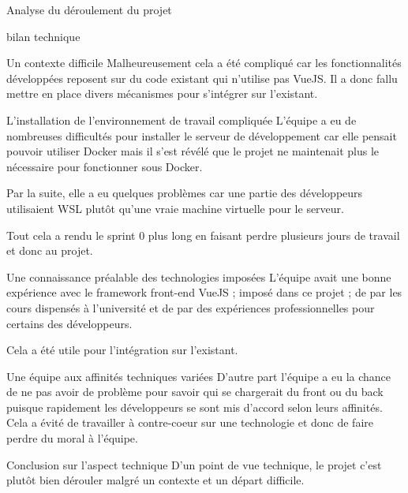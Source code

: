\documentclass[]{article}
\begin{document}
{\begin{section}{Analyse du déroulement du projet}
\begin{subsection}{bilan technique}
\begin{subsubsection}{Un contexte difficile}
         Malheureusement cela a été compliqué car les fonctionnalités développées reposent sur du code existant qui n'utilise pas VueJS. Il a donc fallu mettre en place divers mécanismes pour s'intégrer sur l'existant.
     \end{subsubsection}

     \begin{subsubsection}{L'installation de l'environnement de travail compliquée}
         L'équipe a eu de nombreuses difficultés pour installer le serveur de développement car elle pensait pouvoir utiliser Docker mais il s'est révélé que le projet ne maintenait plus le nécessaire pour fonctionner sous Docker.

         Par la suite, elle a eu quelques problèmes car une partie des développeurs utilisaient WSL plutôt qu'une vraie machine virtuelle pour le serveur.

         Tout cela a rendu le sprint 0 plus long en faisant perdre plusieurs jours de travail et donc au projet.
     \end{subsubsection}

     \begin{subsubsection}{Une connaissance préalable des technologies imposées }
         L'équipe avait une bonne expérience avec le framework front-end VueJS ; imposé dans ce projet ; de par les cours dispensés à l'université et de par des expériences professionnelles pour certains des développeurs.

         Cela a été utile pour l'intégration sur l'existant.
     \end{subsubsection}

     \begin{subsubsection}{Une équipe aux affinités techniques variées }
         D'autre part l'équipe a eu la chance de ne pas avoir de problème pour savoir qui se chargerait du front ou du back puisque rapidement les développeurs se sont mis d'accord selon leurs affinités. Cela a évité de travailler à contre-coeur sur une technologie et donc de faire perdre du moral à l'équipe.
     \end{subsubsection}

     \begin{subsubsection}{Conclusion sur l'aspect technique}
        D'un point de vue technique, le projet c'est plutôt bien dérouler malgré un contexte et un départ difficile.
     \end{subsubsection}
 \end{subsection}


\end{section}}
\end{document}
